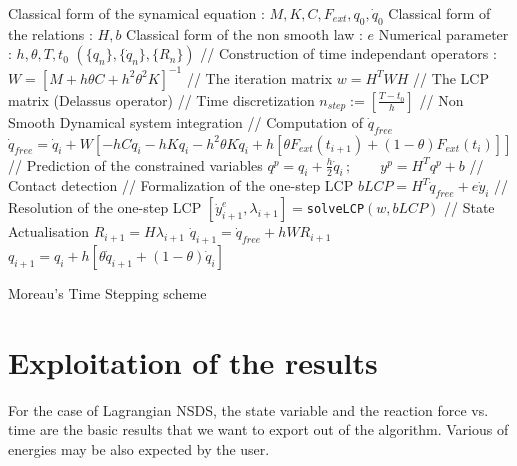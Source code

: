 \documentclass[10pt]{article}
\begin{document}
\begin{algorithm}
  \begin{algorithmic}
{
    \REQUIRE Classical form of the synamical equation : $ M, K, C, F_{ext}, q_0, \dot q_0$
    \REQUIRE  Classical form of the relations : $ H, b$
    \REQUIRE  Classical form of the non smooth law  : $ e$
    \REQUIRE Numerical parameter : $ h, \theta, T, t_0$
    \ENSURE  $(\{ q_n\}, \{ \dot q_n\},\{R_n\}) $     
    \STATE // Construction of time independant operators :
    \STATE $ W = \left[M+h\theta C + h^2 \theta^2 K\right]^{-1}$ // The iteration matrix 
    \STATE $ w = H^{T} W H $ // The LCP matrix (Delassus operator)
    \STATE // Time discretization $n_{step} := [ \frac{T-t_0}{h}]$
    \STATE // Non Smooth Dynamical system integration
        \STATE // Computation of $\dot q_{free}$
        \STATE $\dot q_{free} = \dot q_{i}+  W \left[   - h  C \dot q_{i} - h K q_{i} - h^2 \theta  K \dot q_{i}
+  h\left[\theta  F_{ext}(t_{i+1})+(1-\theta)  F_{ext}(t_{i})  \right]       \right]$
        \STATE // Prediction of the constrained variables
        \STATE $q^{p} = q_i + \frac h 2 \dot q_i\,; \qquad y^{p} = H^T q^p +b $
        \STATE // Contact detection
        \STATE // Formalization of the one-step  LCP
        \STATE $ bLCP =  H^{T} \dot q_{free}  + e \dot y_{i}$
        \STATE // Resolution  of the one-step LCP
        \STATE $ [\dot y^{e}_{i+1}, \lambda_{i+1}]=$\texttt{solveLCP}$(w,bLCP)$
        \ENDIF
        \STATE // State Actualisation
        \STATE $R_{i+1} = H \lambda_{i+1} $
        \STATE $\dot q_{i+1} = \dot q_{free}  + h W R_{i+1}$
        \STATE $q_{i+1} = q_{i} +  h\left[\theta  \dot q_{i+1}+(1-\theta)  \dot q_{i}  \right]$
     \ENDFOR}
  \end{algorithmic}
  \caption{Moreau's Time Stepping scheme}
\label{Algo:MTS}
\end{algorithm}




\section{Exploitation of the results}
\label{Sec:Results}

For the case of Lagrangian NSDS, the state variable and the reaction force vs. time are the basic results that we want to export out of the algorithm. Various of energies may be also expected by the user. 
\end{document}
